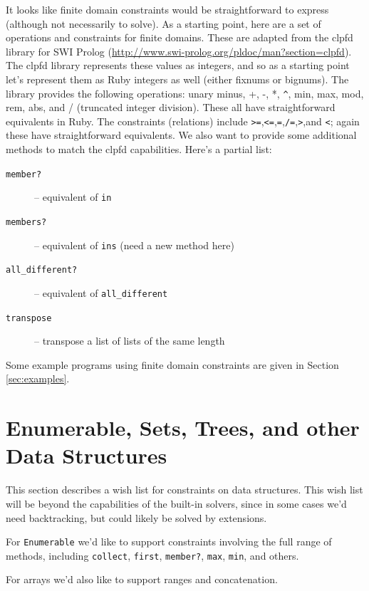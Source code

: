 \documentclass[11pt]{article}
\begin{document}
It looks like finite domain constraints would be straightforward to express
(although not necessarily to solve).  As a starting point, here are a
set of operations and constraints for finite domains.  These are
adapted from the clpfd library for SWI Prolog
(\url{http://www.swi-prolog.org/pldoc/man?section=clpfd}).  The clpfd
library represents these values as integers, and so as a starting
point let's represent them as Ruby integers as well (either fixnums or
bignums).  The library provides the following operations: unary minus,
+, -, *, \lstinline{^}, min, max, mod, rem, abs, and / (truncated integer
division).  These all have straightforward equivalents in Ruby.  The
constraints (relations) include 
\lstinline{>=},\lstinline{<=},\lstinline{=},\lstinline{/=},\lstinline{>},and
\lstinline{<}; again these have straightforward equivalents.  We also
want to provide some additional methods to match the clpfd
capabilities.  Here's a partial list:

\begin{description}
\item[\lstinline{member?}] -- equivalent of \lstinline{in}
\item[\lstinline{members?}] -- equivalent of \lstinline{ins} (need a
  new method here)
\item[\lstinline{all_different?}] -- equivalent of \lstinline{all_different}
\item[\lstinline{transpose}] -- transpose a list of lists of the same length
\end{description}

Some example programs using finite domain constraints are given in Section
\ref{sec:examples}.

\section{Enumerable, Sets, Trees, and other Data Structures}

This section describes a wish list for constraints on data structures.
This wish list will be beyond the capabilities of the built-in
solvers, since in some cases we'd need backtracking, but could likely be
solved by extensions.

For \lstinline{Enumerable} we'd like to support constraints involving
the full range of methods, including \lstinline{collect},
\lstinline{first}, \lstinline{member?}, \lstinline{max},
\lstinline{min}, and others.

For arrays we'd also like to support ranges and concatenation.
\end{document}
